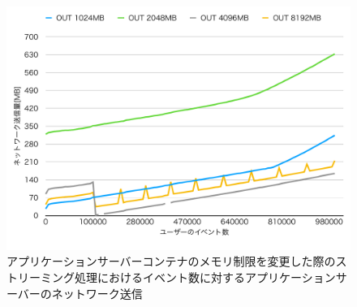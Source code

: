 \documentclass[../../../../../main]{subfiles}
\begin{document}
    \begin{figure}[H]
        \centering
        \includegraphics[width=12cm]{graph}
        \caption{アプリケーションサーバーコンテナのメモリ制限を変更した際のストリーミング処理におけるイベント数に対するアプリケーションサーバーのネットワーク送信}
        \label{fig:stream-change-app-memory-limit-app-net-out-app_4_db_1_1024}
    \end{figure}
\end{document}
